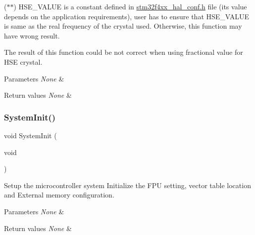 ($\ast$$\ast$) H\+S\+E\+\_\+\+V\+A\+L\+UE is a constant defined in \hyperlink{stm32f4xx__hal__conf_8h}{stm32f4xx\+\_\+hal\+\_\+conf.\+h} file (its value depends on the application requirements), user has to ensure that H\+S\+E\+\_\+\+V\+A\+L\+UE is same as the real frequency of the crystal used. Otherwise, this function may have wrong result.


\begin{DoxyItemize}
\item The result of this function could be not correct when using fractional value for H\+SE crystal.
\end{DoxyItemize}


\begin{DoxyParams}{Parameters}
{\em None} & \\
\hline
\end{DoxyParams}

\begin{DoxyRetVals}{Return values}
{\em None} & \\
\hline
\end{DoxyRetVals}
\mbox{\label{group___s_t_m32_f4xx___system___private___functions_ga93f514700ccf00d08dbdcff7f1224eb2}} 
\subsubsection{\texorpdfstring{System\+Init()}{SystemInit()}}
{\footnotesize\ttfamily void System\+Init (\begin{DoxyParamCaption}\item[{void}]{ }\end{DoxyParamCaption})}



Setup the microcontroller system Initialize the F\+PU setting, vector table location and External memory configuration. 


\begin{DoxyParams}{Parameters}
{\em None} & \\
\hline
\end{DoxyParams}

\begin{DoxyRetVals}{Return values}
{\em None} & \\
\hline
\end{DoxyRetVals}
